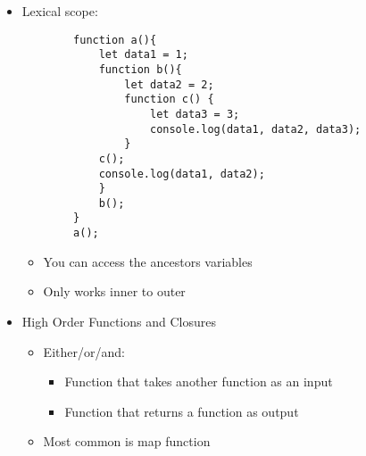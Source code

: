 \documentclass{article}
\begin{document}
\begin{itemize}
\begin{itemize}
        \item Scoped within the braces 
        \item No hoisting at all
    \end{itemize}
    \begin{lstlisting}
        function myscope(){
            if (true) {
                let var x = 5;
                console.log(x);
            }
        }
        myscope();
    \end{lstlisting}
    \begin{itemize}
        \item You don't even need anything before braces
    \end{itemize}
    \begin{lstlisting}
        {
            let var x = 5;
            console.log(x);
        }
    \end{lstlisting}
    \begin{itemize}
        \item Not a real use case
    \end{itemize}
    \item Lexical scope:
    \begin{lstlisting}
        function a(){
            let data1 = 1;
            function b(){
                let data2 = 2;
                function c() {
                    let data3 = 3;
                    console.log(data1, data2, data3);
                }
            c();
            console.log(data1, data2);
            }
            b();
        }
        a();
    \end{lstlisting}
    \begin{itemize}
        \item You can access the ancestors variables
        \item Only works inner to outer
    \end{itemize}
    \item High Order Functions and Closures
    \begin{itemize}
        \item Either/or/and:
        \begin{itemize}
            \item Function that takes another function as an input
            \item Function that returns a function as output
        \end{itemize}
        \item Most common is map function
    \end{itemize}

\end{itemize}
\end{document}
